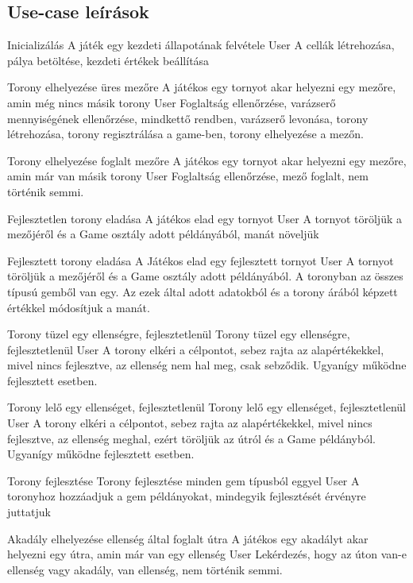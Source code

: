 \subsection{Use-case leírások}

\usecase
{Inicializálás }
{A játék egy kezdeti állapotának felvétele}
{User}
{A cellák létrehozása, pálya betöltése, kezdeti értékek beállítása }

\usecase
{Torony elhelyezése üres mezőre}
{A játékos egy tornyot akar helyezni egy mezőre, amin még nincs másik torony}
{User}
{Foglaltság ellenőrzése, varázserő mennyiségének ellenőrzése, mindkettő rendben, varázserő levonása, torony létrehozása, torony regisztrálása a game-ben, torony elhelyezése a mezőn.}

\usecase
{Torony elhelyezése foglalt mezőre}
{A játékos egy tornyot akar helyezni egy mezőre, amin már van másik torony}
{User}
{Foglaltság ellenőrzése, mező foglalt, nem történik semmi.}

\usecase
{Fejlesztetlen torony eladása}
{A játékos elad egy tornyot}
{User}
{A tornyot töröljük a mezőjéről és a Game osztály adott példányából, manát növeljük}

\usecase
{Fejlesztett torony eladása}
{A Játékos elad egy fejlesztett tornyot}
{User}
{A tornyot töröljük a mezőjéről és a Game osztály adott példányából. A toronyban az összes típusú gemből van egy. Az ezek által adott adatokból és a torony árából képzett értékkel módosítjuk a manát.}

\usecase
{Torony tüzel egy ellenségre, fejlesztetlenül}
{Torony tüzel egy ellenségre, fejlesztetlenül}
{User}
{A torony elkéri a célpontot, sebez rajta az alapértékekkel, mivel nincs fejlesztve, az ellenség nem hal meg, csak sebződik. Ugyanígy működne fejlesztett esetben.}

\usecase
{Torony lelő egy ellenséget, fejlesztetlenül}
{Torony lelő egy ellenséget, fejlesztetlenül}
{User}
{A torony elkéri a célpontot, sebez rajta az alapértékekkel, mivel nincs fejlesztve, az ellenség meghal, ezért töröljük az útról és a Game példányból. Ugyanígy működne fejlesztett esetben.}

\usecase
{Torony fejlesztése}
{Torony fejlesztése minden gem típusból eggyel}
{User}
{A toronyhoz hozzáadjuk a gem példányokat, mindegyik fejlesztését érvényre juttatjuk}

\usecase
{Akadály elhelyezése ellenség által foglalt útra}
{A játékos egy akadályt akar helyezni egy útra, amin már van egy ellenség}
{User}
{Lekérdezés, hogy az úton van-e ellenség vagy akadály, van ellenség, nem történik semmi.}

